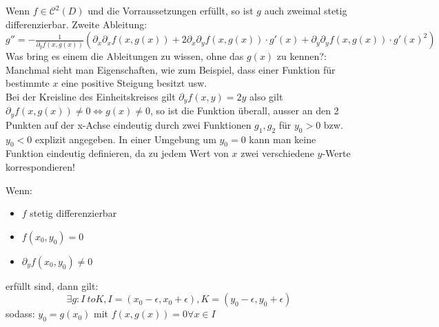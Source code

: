 \documentclass[german]{latex4ei/latex4ei_sheet}
\begin{document}
Wenn $f \in \mathcal{C}^2(D)$ und die Vorraussetzungen erf\"ullt, so ist $g$ auch zweimal stetig differenzierbar. Zweite Ableitung: $g''=-\frac{1}{\partial_y f(x,g(x))}(\partial_x \partial_x f(x,g(x))+2 \partial_x \partial_y f(x,g(x))\cdot g'(x)+\partial_y \partial_y f(x,g(x))\cdot g'(x)^2)$\\
Was bring es einem die Ableitungen zu wissen, ohne das $g(x)$ zu kennen?: Manchmal sieht man Eigenschaften, wie zum Beispiel, dass einer Funktion f\"ur bestimmte $x$ eine positive Steigung besitzt usw.\\
Bei der Kreisline des Einheitskreises gilt $\partial_y f(x,y)=2y$ also gilt $\partial_y f(x,g(x))\neq 0 \Leftrightarrow g(x) \neq 0$, so ist die Funktion \"uberall, ausser an den 2 Punkten auf der x-Achse eindeutig durch zwei Funktionen $g_1,g_2$ f\"ur $y_0>0$ bzw. $y_0 < 0$ explizit angegeben. In einer Umgebung um $y_0=0$ kann man keine Funktion eindeutig definieren, da zu jedem Wert von $x$ zwei verschiedene $y$-Werte korrespondieren!

\begin{emphbox}
Wenn:
\begin{itemize}
\item $f$ stetig differenzierbar
\item $f(x_0,y_0)=0$
\item $\partial_y f(x_0,y_0)\neq 0$
\end{itemize}
erf\"ullt sind, dann gilt:
\[\exists g: I\ to K , I=(x_0-\epsilon,x_0+\epsilon), K=(y_0-\epsilon,y_0+\epsilon)\]
sodass: $y_0=g(x_0)$ mit $f(x,g(x))=0 \forall x\in I$
\end{emphbox}
\end{document}
